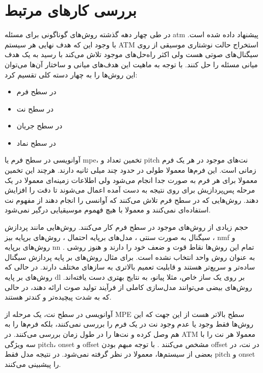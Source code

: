 \chapter{بررسی کارهای مرتبط}
در طی چهار دهه گذشته روش‌های گوناگونی برای مسئله \gls{atm} پیشنهاد داده شده است.
با وجود این که هدف نهایی هر سیستم \gls{ATM} استخراج حالت نوشتاری موسیقی از روی
سیگنال‌های صوتی هست ولی اکثر راه‌حل‌های موجود تلاش می‌کند با رسید به یک هدف
میانی مسئله را حل کنند. با توجه به ماهیت این هدف‌های میانی و ساختار آن‌ها
می‌توان این روش‌ها را به چهار دسته کلی تقسیم کرد:
\begin{itemize}
    \item در سطح فرم
    \item در سطح نت
    \item در سطح جریان
    \item در سطح نماد
\end{itemize}

آوانویسی در سطح فرم یا \gls{mpe}، تخمین تعداد و \gls{pitch} نت‌های موجود در هر
یک فرم زمانی است. این فرم‌ها معمولا طولی در حدود چند میلی ثانیه دارند. هرچند این
تخمین معمولا برای هر فرم به صورت جدا انجام می‌شود ولی اطلاعات زمینه‌ای معمولا در
یک مرحله‌ پس‌پردازیش برای روی نتیجه به دست آمده اعمال می‌شوند تا دقت را افزایش
دهند. روش‌هایی که در سطح فرم تلاش می‌کنند که آوانسی را انجام دهند از مفهوم نت
استفاده‌ای نمی‌کنند و معمولا با هیچ فهموم موسیقیایی درگیر نمی‌شود.

حجم زیادی از روش‌های موجود در سطح فرم کار می‌کنند. روش‌هایی مانند پردازش سیگنال
به صورت سنتی \cite{emiya2009multipitch,su2015combining}، مدل‌های برپایه احتمال
\cite{duan2010multiple}، روش‌های برپایه بیز \cite{peeling2009generative}، \gls{nmf}
\cite{smaragdis2003non,vincent2009adaptive,benetos2013automatic,fuentes2013harmonic}
و روش‌های برپایه \gls{nn} \cite{sigtia2016end,kelz2016potential}. تمام این
روش‌ها نقاط قوت و ضعف خود را دارند و هنوز روشی به عنوان روش واحد انتخاب نشده
است. برای مثال روش‌های بر پایه پردازش سیگنال ساده‌تر و سریع‌تر هستند و قابلیت
تعمیم بالاتری به سازهای مختلف دارند. در حالی که روش‌های بر پایه \gls{dl} بر روی
یک ساز خاص، مثلا پیانو، به نتایج بهتری دست یافته‌اند. روش‌های بیضی می‌توانند
مدل‌سازی کاملی از فرآیند تولید صوت ارائه دهند، در حالی که به شدت پیچیده‌تر و
کندتر هستند.

آوانویسی در سطح نت، یک مرحله از \gls{MPE} سطح بالاتر هست از این جهت که این
روش‌ها فقط وجود یا عدم وجود نت در یک فرم را بررسی نمی‌کنند، بلکه فرم‌ها را به هم
وصل کرده و نت‌ها را در طول زمان بررسی می‌کنند. در \gls{ATM} معمولا هر نت را با
سه ویژگی \gls{pitch}، onset و offset مشخص می‌کنند \cite{klapuri2007signal}. با
توجه مبهم بودن offset در نت، در بعضی از سیستم‌ها، معمولا در نظر گرفته نمی‌شود.
در نتیجه مدل فقط \gls{pitch} و onset را پیشبینی می‌کنند.

